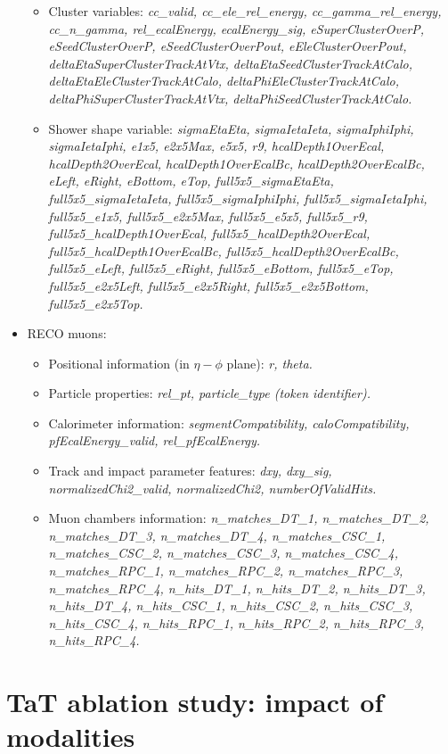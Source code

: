 \begin{itemize}
\begin{itemize}
		\item Cluster variables: \textit{cc\_valid, cc\_ele\_rel\_energy, cc\_gamma\_rel\_energy, cc\_n\_gamma, rel\_ecalEnergy, ecalEnergy\_sig, eSuperClusterOverP, eSeedClusterOverP, eSeedClusterOverPout, eEleClusterOverPout,
		deltaEtaSuperClusterTrackAtVtx, deltaEtaSeedClusterTrackAtCalo, deltaEtaEleClusterTrackAtCalo,
		deltaPhiEleClusterTrackAtCalo, deltaPhiSuperClusterTrackAtVtx, deltaPhiSeedClusterTrackAtCalo.}
		
		\item Shower shape variable: \textit{sigmaEtaEta, sigmaIetaIeta, sigmaIphiIphi, sigmaIetaIphi, e1x5, e2x5Max, e5x5, r9, hcalDepth1OverEcal, hcalDepth2OverEcal, hcalDepth1OverEcalBc, hcalDepth2OverEcalBc, eLeft, eRight, eBottom, eTop, full5x5\_sigmaEtaEta, full5x5\_sigmaIetaIeta, full5x5\_sigmaIphiIphi, full5x5\_sigmaIetaIphi, full5x5\_e1x5, full5x5\_e2x5Max, full5x5\_e5x5, full5x5\_r9, full5x5\_hcalDepth1OverEcal, full5x5\_hcalDepth2OverEcal, full5x5\_hcalDepth1OverEcalBc, full5x5\_hcalDepth2OverEcalBc, full5x5\_eLeft, full5x5\_eRight, full5x5\_eBottom, full5x5\_eTop, full5x5\_e2x5Left, full5x5\_e2x5Right, full5x5\_e2x5Bottom, full5x5\_e2x5Top.}
	\end{itemize}
	\item RECO muons:
	\begin{itemize}
		\item Positional information (in $\eta-\phi$ plane): \textit{r, theta.}
		\item Particle properties:  \textit{rel\_pt, particle\_type (token identifier).}
		\item Calorimeter information: 	\textit{segmentCompatibility, caloCompatibility, pfEcalEnergy\_valid, rel\_pfEcalEnergy.}
		\item Track and impact parameter features: \textit{dxy, dxy\_sig, normalizedChi2\_valid, normalizedChi2, numberOfValidHits.}
		\item Muon chambers information: \textit{n\_matches\_DT\_1, n\_matches\_DT\_2, n\_matches\_DT\_3, n\_matches\_DT\_4, n\_matches\_CSC\_1, n\_matches\_CSC\_2, n\_matches\_CSC\_3, n\_matches\_CSC\_4, n\_matches\_RPC\_1, n\_matches\_RPC\_2, n\_matches\_RPC\_3, n\_matches\_RPC\_4,  n\_hits\_DT\_1, n\_hits\_DT\_2, n\_hits\_DT\_3, n\_hits\_DT\_4, n\_hits\_CSC\_1, n\_hits\_CSC\_2, n\_hits\_CSC\_3, n\_hits\_CSC\_4, n\_hits\_RPC\_1, n\_hits\_RPC\_2, n\_hits\_RPC\_3, n\_hits\_RPC\_4.}
	\end{itemize}
\end{itemize}
\newpage
\section{TaT ablation study: impact of modalities}\label{app:tat-add}

